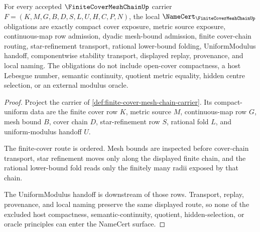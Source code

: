 \begin{theorem}
\label{thm:finite-cover-mesh-chain-namecert-obligations}
For every accepted $\FiniteCoverMeshChainUp$ carrier $F=(K,M,G,B,D,S,L,U,H,C,P,N)$, the local $\NameCert_{\FiniteCoverMeshChainUp}$ obligations are exactly compact cover exposure, metric source exposure, continuous-map row admission, dyadic mesh-bound admission, finite cover-chain routing, star-refinement transport, rational lower-bound folding, UniformModulus handoff, componentwise stability transport, displayed replay, provenance, and local naming. The obligations do not include open-cover compactness, a host Lebesgue number, semantic continuity, quotient metric equality, hidden centre selection, or an external modulus oracle.
\end{theorem}
\begin{proof}
Project the carrier of \autoref{def:finite-cover-mesh-chain-carrier}. Its compact-uniform data are the finite cover row $K$, metric source $M$, continuous-map row $G$, mesh bound $B$, cover chain $D$, star-refinement row $S$, rational fold $L$, and uniform-modulus handoff $U$.

The finite-cover route is ordered. Mesh bounds are inspected before cover-chain transport, star refinement moves only along the displayed finite chain, and the rational lower-bound fold reads only the finitely many radii exposed by that chain.

The UniformModulus handoff is downstream of those rows. Transport, replay, provenance, and local naming preserve the same displayed route, so none of the excluded host compactness, semantic-continuity, quotient, hidden-selection, or oracle principles can enter the NameCert surface.
\end{proof}


